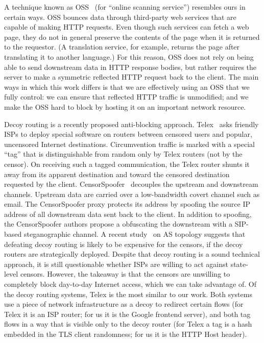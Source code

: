 \documentclass{article}
\begin{document}

A technique known as OSS~\cite{oss} (for
``online scanning service'') resembles ours in certain ways. OSS bounces data
through third-party web services that are capable of making HTTP requests.
Even though such services can fetch a web page, they do not in general
preserve the contents of the page when it is returned to the requestor.
(A translation service, for example,
returns the page after translating it to another language.)
For this reason, OSS does not rely on being able to send downstream data in HTTP response bodies,
but rather requires the server to make a symmetric reflected HTTP request back to the client.
The main ways in which this work differs is that we are effectively using an OSS that we fully control:
we can ensure that reflected HTTP traffic is unmodified;
and we make the OSS hard to block by hosting it on an important network resource.

Decoy routing is
a recently proposed anti-blocking approach. Telex~\cite{telex}
asks friendly ISPs to deploy special software on routers between censored users and
popular, uncensored Internet destinations.
Circumvention traffic is marked with a special ``tag'' that is distinguishable from random only
by Telex routers (not by the censor).
On receiving such a tagged communication, the Telex router shunts it away from its apparent destination
and toward the censored destination requested by the client.
CensorSpoofer~\cite{censorspoofer}
decouples the upstream and downstream channels.
Upstream data are carried over a low-bandwidth covert channel such as email.
The CensorSpoofer proxy protects its address by
spoofing the source IP address of all downstream data sent back to the client.
In addition to spoofing, the CensorSpoofer authors propose a obfuscating the downstream with a SIP-based steganographic channel.
A recent study~\cite{nodirectionhome} on AS
topology suggests that defeating decoy routing is likely to be expensive for the
censors, if the decoy routers are strategically deployed. Despite that decoy
routing is a sound technical approach, it is still questionable whether ISPs are
willing to act against state-level censors. However, the takeaway is that the
censors are unwilling to completely block day-to-day Internet access, which we
can take advantage of.
Of the decoy routing systems, Telex is the most similar to our work.
Both systems use a piece of network infrastructure as a decoy to redirect certain flows
(for Telex it is an ISP router; for us it is the Google frontend server),
and both tag flows in a way that is visible only to the decoy router
(for Telex a tag is a hash embedded in the TLS client randomness; for us it is the HTTP Host header).
\end{document}
